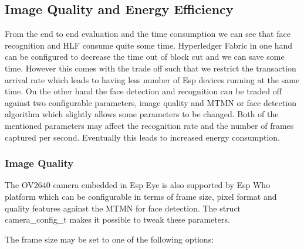 

\subsection{Image Quality and Energy Efficiency}

From the end to end evaluation and the time consumption we can see that face recognition and HLF consume quite some time. Hyperledger Fabric in one hand can be configured to decrease the time out of block cut and we can save some time. However this comes with the trade off such that we restrict the transaction arrival rate which leads to having less number of Esp devices running at the same time. 
On the other hand the face detection and recognition can be traded off against two configurable parameters, image quality and MTMN or face detection algorithm which slightly allows some parameters to be changed. Both of the mentioned parameters may affect the recognition rate and the number of frames captured per second. Eventually this leads to increased energy consumption. 

\subsubsection{Image Quality}

The OV2640 camera embedded in Esp Eye is also supported by Esp Who platform which can be configurable in terms of frame size, pixel format and quality features against the MTMN for face detection. The struct {\selectfont camera\_config\_t} makes it possible to tweak these parameters. 

The frame size may be set to one of the following options:

